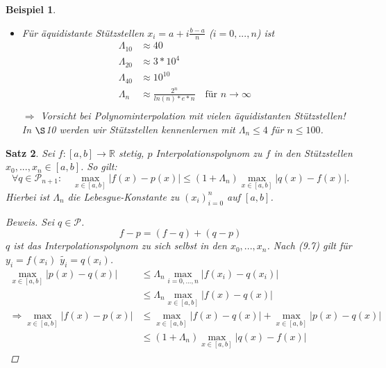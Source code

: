 \documentclass[12pt]{article}
\theoremstyle{break}
\newtheorem{theorem}{Satz}[subsection]
\newtheorem{example}[theorem]{Beispiel}
\begin{document}
\begin{example}
\begin{description}\item \end{description}
\begin{itemize}
  \item Für äquidistante Stützstellen $x_i = a + i\frac{b-a}{n}$ ($i=0,...,n$) ist 
    \begin{align*}
    \Lambda_{10} &\approx 40 &\\
    \Lambda_{20} &\approx 3*10^4 &\\
    \Lambda_{40} &\approx 10^{10} &\\
    \Lambda_{n} &\approx \frac{2^n}{ln(n)*e*n} \quad \text{für } n \rightarrow \infty&\\
    \end{align*}
    $\Rightarrow$ Vorsicht bei Polynominterpolation mit vielen äquidistanten Stützstellen! \\
    In $\S$10 werden wir Stützstellen kennenlernen mit $\Lambda_n \leq 4$ für $n \leq 100$.
\end{itemize}
\end{example}

\begin{theorem}
Sei $f: [a,b] \rightarrow \mathbb{R}$ stetig, $p$ Interpolationspolynom zu $f$ in den Stützstellen $x_0,..., x_n \in [a,b]$. So gilt:
\[ \forall q \in \mathcal{P}_{n+1}: \quad \max_{x \in [a,b] } \vert f(x) -p(x) \vert \leq (1+ \Lambda_n) \max_{x \in [a,b]} \vert q(x) - f(x) \vert .\]
Hierbei ist $\Lambda_n$ die Lebesgue-Konstante zu $(x_i)_{i=0}^n$ auf $[a,b]$.
\begin{proof}[Beweis]
Sei $q \in \mathcal{P}$.
\[ f-p = (f-q) + (q-p)\]
$q$ ist das Interpolationspolynom zu sich selbst in den $x_0,..., x_n$. Nach (9.7) gilt für $y_i = f(x_i)$ $\tilde{y_i}  = q(x_i)$.
\begin{align*}
\max_{x \in [a,b]} \vert p(x) - q(x) \vert &\leq \Lambda_n \max_{i=0,...,n} \vert f(x_i) - q(x_i) \vert &\\
&\leq \Lambda_n \max_{x \in [a,b]} \vert f(x)-q(x) \vert &\\
\Rightarrow \max_{x \in [a,b]} \vert f(x) - p(x) \vert &\leq \max_{x \in [a,b]} \vert f(x)-q(x) \vert + \max_{x \in [a,b]} \vert p(x)-q(x) \vert &\\
&\leq (1+ \Lambda_n) \max_{x \in [a,b]} \vert q(x) - f(x) \vert 
\end{align*}
\end{proof}
\end{theorem}
\end{document}
